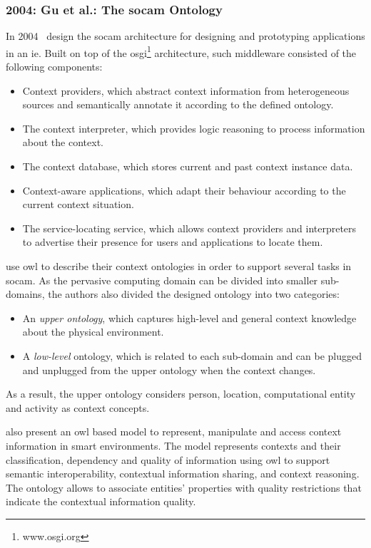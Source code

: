 \subsubsection{2004: Gu et al.: The \ac{socam} Ontology}
\label{sec:gu}

In 2004~\citet{gu_toward_2004} design the \acf{socam} architecture for designing 
and prototyping applications in an \ac{ie}. Built on top of the 
\ac{osgi}\footnote{www.osgi.org} architecture, such middleware consisted of the 
following components:

\begin{itemize}
  \item Context providers, which abstract context information from heterogeneous
  sources and semantically annotate it according to the defined ontology.
  \item The context interpreter, which provides logic reasoning to process
  information about the context.
  \item The context database, which stores current and past context instance data.
  \item Context-aware applications, which adapt their behaviour according to the
  current context situation.
  \item The service-locating service, which allows context providers and 
  interpreters to advertise their presence for users and applications to locate 
  them.
\end{itemize}

\citeauthor{gu_toward_2004} use \ac{owl} to describe their context ontologies 
in order to support several tasks in \ac{socam}. As the pervasive computing 
domain can be divided into smaller sub-domains, the authors also divided the 
designed ontology into two categories: 

\begin{itemize}
  \item An \textit{upper ontology}, which captures high-level and general 
  context knowledge about the physical environment.
  \item A \textit{low-level} ontology, which is related to each sub-domain and 
  can be plugged and unplugged from the upper ontology when the context changes.
\end{itemize}

As a result, the upper ontology considers person, location, computational entity
and activity as context concepts.

\bigskip

\citet{gu_ontology_based_2004} also present an \ac{owl} based model to represent, 
manipulate and access context information in smart environments. The model 
represents contexts and their classification, dependency and quality of
information using \ac{owl} to support semantic interoperability, contextual 
information sharing, and context reasoning. The ontology allows to associate 
entities' properties with quality restrictions that indicate the contextual 
information quality. 
